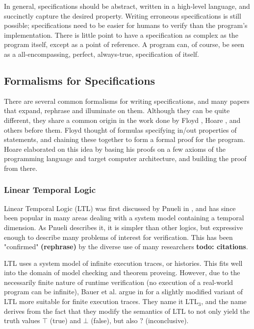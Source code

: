 \documentclass[a4paper,11pt]{kth-mag}
\newcommand{\todo}[1]{\textbf{todo: #1}}
\newcommand{\rephrase}{\textbf{(rephrase)} }
\begin{document}
In general, specifications should be abstract, written in a high-level
language, and succinctly capture the desired property. Writing erroneous
specifications is still possible; specifications need to be easier for humans
to verify than the program's implementation. There is little point to have a
specification as complex as the program itself, except as a point of reference.
A program can, of course, be seen as a all-encompassing, perfect, always-true,
specification of itself.



\subsection{Formalisms for Specifications}

There are several common formalisms for writing specifications, and many papers
that expand, rephrase and illuminate on them. Although they can be quite
different, they share a common origin in the work done by Floyd \cite{floyd67},
Hoare \cite{hoare69}, and others before them.  Floyd thought of formulas
specifying in/out properties of statements, and chaining these together to form
a formal proof for the program. Hoare elaborated on this idea by basing his
proofs on a few axioms of the programming language and target computer
architecture, and building the proof from there.

\subsubsection{Linear Temporal Logic}

Linear Temporal Logic (LTL) was first discussed by Pnueli in \cite{pnueli77},
and has since been popular in many areas dealing with a system model containing
a temporal dimension. As Pnueli describes it, it is simpler than other logics,
but expressive enough to describe many problems of interest for verification.
This has been "confirmed" \rephrase by the diverse use of many researchers
\todo{citations}.

LTL uses a system model of infinite execution traces, or histories. This fits
well into the domain of model checking and theorem proveing. However, due to
the necessarily finite nature of runtime verification (no execution of a
real-world program can be infinite), Bauer et al. argue in
\cite{bauer07rvltl,bauer06monitoring} for a slightly modified variant of LTL
more suitable for finite execution traces. They name it LTL$_3$, and the name
derives from the fact that they modify the semantics of LTL to not only yield
the truth values $\top$ (true) and $\bot$ (false), but also $?$ (inconclusive).
\end{document}
